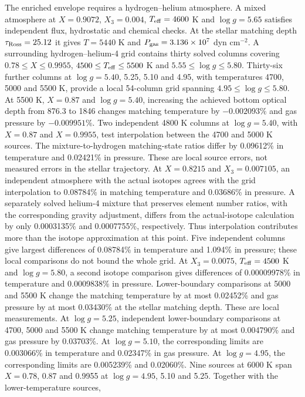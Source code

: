 \documentclass[11pt,letterpaper]{article}
\begin{document}
The enriched envelope requires a hydrogen--helium atmosphere.
A mixed atmosphere at $X=0.9072$, $X_3=0.004$, $T_{\rm eff}=4600$ K and
$\log g=5.65$ satisfies independent flux, hydrostatic and chemical checks.
At the stellar matching depth $\tau_{\rm Ross}=25.12$ it gives $T=5440$ K and
$P_{\rm gas}=3.136\times10^7$ dyn cm$^{-2}$. A surrounding hydrogen--helium-4
grid contains thirty solved columns covering $0.78\leq X\leq0.9955$,
$4500\leq T_{\rm eff}\leq5500$ K and $5.55\leq\log g\leq5.80$.
Thirty-six further columns at $\log g=5.40$, 5.25, 5.10 and 4.95, with temperatures
4700, 5000 and 5500 K, provide a local 54-column grid spanning
$4.95\leq\log g\leq5.80$.
At 5500 K, $X=0.87$ and $\log g=5.40$, increasing the achieved bottom
optical depth from 876.3 to 1846 changes matching temperature by
$-0.002093\%$ and gas pressure by $-0.009951\%$.
Two independent 4800 K columns at $\log g=5.40$, with $X=0.87$ and
$X=0.9955$, test interpolation between the 4700 and 5000 K sources.
The mixture-to-hydrogen matching-state ratios differ by 0.09612\% in
temperature and 0.02421\% in pressure. These are local source errors,
not measured errors in the stellar trajectory.
At $X=0.8215$ and $X_3=0.007105$, an independent atmosphere with the actual
isotopes agrees with the grid interpolation to 0.08784\% in matching temperature
and 0.03686\% in pressure. A separately solved helium-4 mixture that preserves
element number ratios, with the corresponding gravity adjustment, differs from
the actual-isotope calculation by only 0.0003135\% and 0.0007755\%, respectively.
Thus interpolation contributes more than the isotope approximation at this
point. Five independent columns give largest differences of 0.08784\% in
temperature and 1.094\% in pressure; these local comparisons do not bound the
whole grid. At $X_3=0.0075$, $T_{\rm eff}=4500$ K and $\log g=5.80$,
a second isotope comparison gives differences of 0.00009978\% in temperature
and 0.0009838\% in pressure. Lower-boundary comparisons at 5000 and 5500 K
change the matching temperature by at most 0.02452\% and gas pressure by
at most 0.03430\% at the stellar matching depth. These are local measurements.
At $\log g=5.25$, independent lower-boundary comparisons at 4700, 5000
and 5500 K change matching temperature by at most 0.004790\% and gas
pressure by 0.03703\%. At $\log g=5.10$, the corresponding limits
are 0.003066\% in temperature and 0.02347\% in gas pressure.
At $\log g=4.95$, the corresponding limits are 0.005239\% and 0.02060\%.
Nine sources at 6000 K span $X=0.78$, 0.87 and 0.9955 at
$\log g=4.95$, 5.10 and 5.25. Together with the lower-temperature sources,
\end{document}
